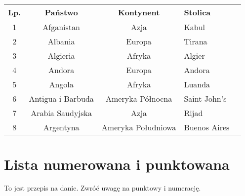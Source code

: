 \begin{table}[h]
    \centering
    \begin{tabular}{|c|c|c|l|l|}
    \hline
    \textbf{Lp.} & \textbf{Państwo} & \textbf{Kontynent} & \textbf{Stolica} \\ \hline
    1   & Afganistan       & Azja      & Kabul     \\ \hline
    2   & Albania          & Europa    & Tirana    \\ \hline
    3   & Algieria         & Afryka    & Algier    \\ \hline
    4   & Andora           & Europa    & Andora    \\ \hline
    5   & Angola           & Afryka    & Luanda    \\ \hline
    6   & Antigua i Barbuda& Ameryka Północna & Saint John's \\ \hline
    7   & Arabia Saudyjska & Azja      & Rijad     \\ \hline
    8   & Argentyna        & Ameryka Południowa & Buenos Aires \\ \hline
    \end{tabular}
    \caption{}
    \label{tab:tabela1}
\end{table}
\section{Lista numerowana i punktowana}
To jest przepis na danie. Zwróć uwagę na punktowy i numerację.

